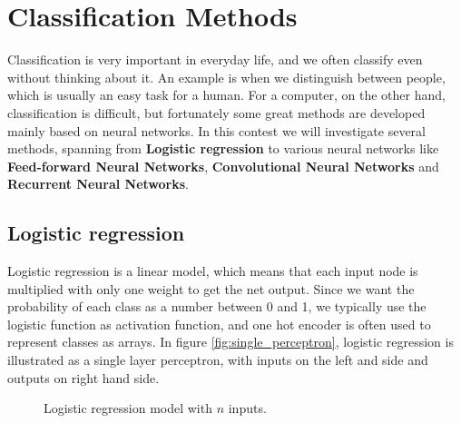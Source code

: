 \section{Classification Methods} \label{sec:methods}
Classification is very important in everyday life, and we often classify even without thinking about it. An example is when we distinguish between people, which is usually an easy task for a human. For a computer, on the other hand, classification is difficult, but fortunately some great methods are developed mainly based on neural networks. In this contest we will investigate several methods, spanning from \textbf{Logistic regression} to various neural networks like \textbf{Feed-forward Neural Networks}, \textbf{Convolutional Neural Networks} and \textbf{Recurrent Neural Networks}. 

\subsection{Logistic regression}
Logistic regression is a linear model, which means that each input node is multiplied with only one weight to get the net output. Since we want the probability of each class as a number between 0 and 1, we typically use the logistic function as activation function, and one hot encoder is often used to represent classes as arrays. In figure \eqref{fig:single_perceptron}, logistic regression is illustrated as a single layer perceptron, with inputs on the left and side and outputs on right hand side. 

\begin{figure} [H]
	\centering
	\caption{Logistic regression model with $n$ inputs.}
	\label{fig:single_perceptron}
\end{figure}

